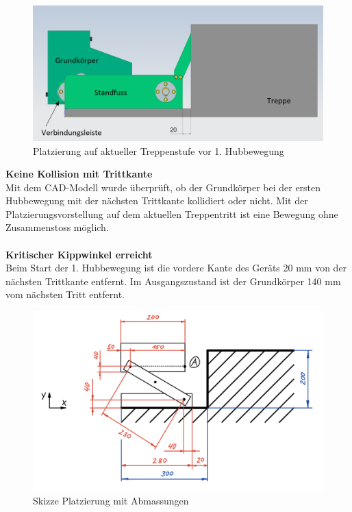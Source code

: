 \begin{figure}[H]
  \includegraphics[width=1\textwidth]{img/Treppensteigen/Platzierung auf Treppe final.PNG}
  \centering
  \caption{Platzierung auf aktueller Treppenstufe vor 1. Hubbewegung}
  \label{fig:platzierung-auf-treppenstufe-hubbewegung-1}
\end{figure}

\textbf{Keine Kollision mit Trittkante}\\
Mit dem CAD-Modell wurde überprüft, ob der Grundkörper bei der ersten Hubbewegung mit der nächsten Trittkante kollidiert oder nicht. Mit der Platzierungsvorstellung auf dem aktuellen Treppentritt ist eine Bewegung ohne Zusammenstoss möglich.\\
\\

\textbf{Kritischer Kippwinkel erreicht}\\
Beim Start der 1. Hubbewegung ist die vordere Kante des Geräts 20 mm von der nächsten Trittkante entfernt. Im Ausgangszustand ist der Grundkörper 140 mm vom nächsten Tritt entfernt.\\

\begin{figure}[H]
  \includegraphics[width=0.8
  \textwidth]{img/Treppensteigen/Skizze Platzierung}
  \centering
  \caption{Skizze Platzierung mit Abmassungen}
  \label{fig:skizze-platzierung}
\end{figure}

